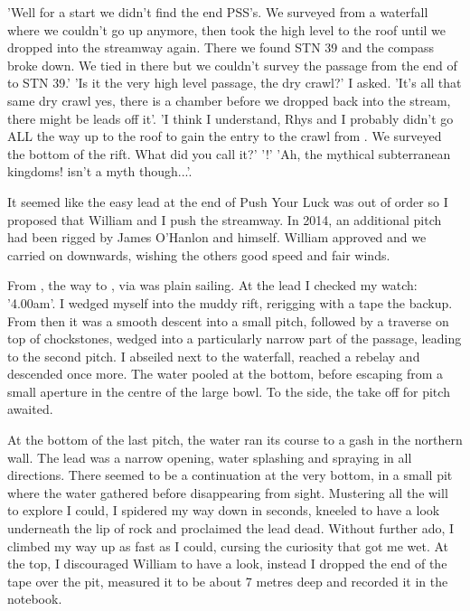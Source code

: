 'Well for a start we didn't find the end PSS's. We surveyed from a waterfall where we couldn't go up anymore, then took the high level to the roof until we dropped into the streamway again. There we found  STN 39 and the compass broke down. We tied in there but we couldn't survey the passage from the end of  to STN 39.'
 'Is it the very high level passage, the dry crawl?' I asked. 
'It's all that same dry crawl yes, there is a chamber before we dropped back into the stream, there might be leads off it'. 
'I think I understand, Rhys and I probably didn't go ALL the way up to the roof to gain the entry to the crawl from . We surveyed the bottom of the rift. What did you call it?'
'!'
'Ah, the mythical subterranean kingdoms!  isn't a myth though...'.


It seemed like the easy lead at the end of Push Your Luck was out of order so I proposed that William and I push the  streamway. In 2014, an additional pitch had been rigged by James O'Hanlon and himself. William approved and we carried on downwards, wishing the others good speed and fair winds. 

From , the way to , via  was plain sailing. At the lead I checked my watch: '4.00am'. I wedged myself into the muddy rift, rerigging with a tape the backup. From then it was a smooth descent into a small pitch, followed by a traverse on top of chockstones, wedged into a particularly narrow part of the passage, leading to the second pitch. I abseiled next to the waterfall, reached a rebelay and descended once more. The water pooled at the bottom, before escaping from a small aperture in the centre of the large bowl. To the side, the take off for  pitch awaited. 

At the bottom of the last pitch, the water ran its course to a gash in the northern wall. The lead was a narrow opening, water splashing and spraying in all directions. There seemed to be a continuation at the very bottom, in a small pit where the water gathered before disappearing from sight. Mustering all the will to explore I could, I spidered my way down in seconds, kneeled to have a look underneath the lip of rock and proclaimed the lead dead. Without further ado, I climbed my way up as fast as I could, cursing the curiosity that got me wet. At the top, I discouraged William to have a look, instead I dropped the end of the tape over the pit, measured it to be about 7 metres deep and recorded it in the notebook. 

